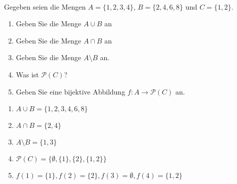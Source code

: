 \newcommand{\printpraesenzlsg}{false}
\newcommand{\printloesungen}{true}
\newcommand{\printbewertungen}{false}
\newcommand{\blattnummer}{1}




\iforiginal{}
\\
Gegeben seien die Mengen $A=\{1,2,3,4\}$, $B=\{2,4,6,8\}$ und $C=\{1,2\}$.
\begin{enumerate}
\item Geben Sie die Menge $A\cup B$ an
\item Geben Sie die Menge $A\cap B$ an
\item Geben Sie die Menge $A\setminus B$ an.
\item Was ist $\mathscr{P}(C)$?
\item Geben Sie eine bijektive Abbildung $f:A\to\mathscr{P}(C)$ an.

\end{enumerate}
\begin{loesung}
\begin{enumerate}
\item $A\cup B=\{1,2,3,4,6,8\}$
\item $A\cap B=\{2,4\}$
\item $A\setminus B=\{1,3\}$
\item $\mathscr{P}(C)=\{\emptyset,\{1\},\{2\},\{1,2\}\}$
\item $f(1)=\{1\}, f(2)=\{2\}, f(3)=\emptyset, f(4)=\{1,2\}$
\end{enumerate}
\end{loesung}

